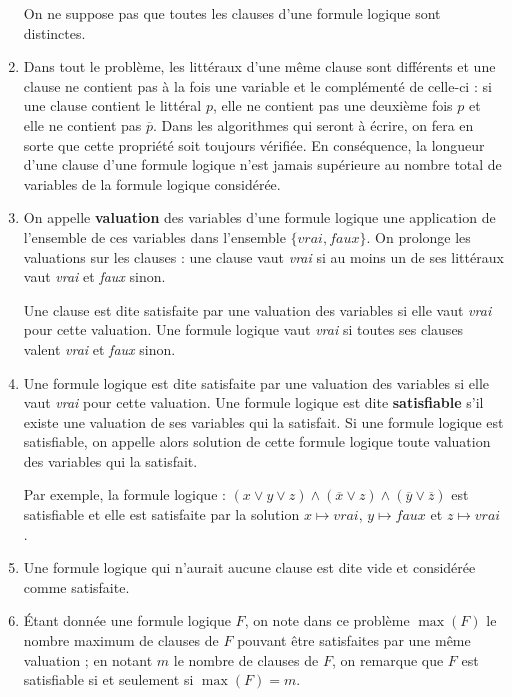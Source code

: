 \begin{enumerate}
On ne suppose pas que toutes les clauses d’une formule logique sont distinctes.
\item Dans tout le problème, les littéraux d’une même clause sont différents et une clause ne contient pas à la fois une variable et le complémenté de celle-ci : si une clause contient le littéral $p$, elle ne contient pas une deuxième fois $p$ et elle ne contient pas $\overline p$. Dans les algorithmes qui seront à écrire, on fera en sorte que cette propriété soit toujours vérifiée. En conséquence, la longueur d’une clause d’une formule logique n’est jamais supérieure au nombre total de variables de la formule logique considérée.
\item On appelle {\bf valuation} des variables d’une formule logique une application de l’ensemble de ces variables dans l’ensemble $\{ vrai, faux\}$. On prolonge les valuations  sur les clauses : une clause vaut {\it vrai} si au moins un de ses littéraux vaut {\it vrai} et {\it faux} sinon. 

Une clause est dite satisfaite par une valuation des variables si elle vaut {\it vrai} pour cette valuation. Une formule logique vaut {\it vrai} si toutes ses clauses valent {\it vrai} et {\it faux} sinon. 
\item Une formule logique est dite satisfaite par une valuation des variables si elle vaut {\it vrai} pour cette valuation. Une formule logique est dite {\bf satisfiable} s’il existe une valuation de ses variables qui la satisfait. Si une formule logique est satisfiable, on appelle alors solution de cette formule logique toute valuation des variables qui la satisfait.

Par exemple, la formule logique : $(x \lor y \lor z) \land (\overline x \lor z) \land (\overline y \lor \overline z)$ est satisfiable et elle est satisfaite par la solution $x \mapsto vrai$, $y \mapsto faux$ et $z\mapsto vrai$.
\item Une formule logique qui n’aurait aucune clause est dite vide et considérée comme satisfaite.
\item Étant donnée une formule logique $F$, on note dans ce problème $\max(F)$ le nombre maximum de clauses de $F$ pouvant être satisfaites par une même valuation ; en notant $m$ le nombre de clauses de $F$, on remarque que $F$ est satisfiable si et seulement si $\max(F) = m$.
\end{enumerate}
